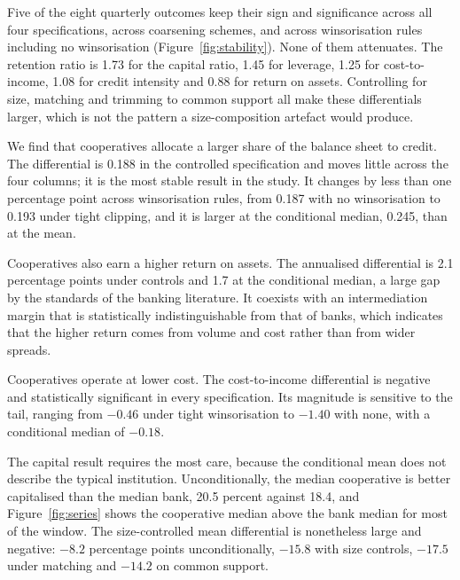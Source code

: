 \documentclass[11pt,a4paper]{article}
\begin{document}
\begin{table}[htbp]
\centering
\begin{threeparttable}
\caption{Cooperative differential against banks, four specifications}
\label{tab:main}

\end{threeparttable}
\end{table}

Five of the eight quarterly outcomes keep their sign and significance across all four
specifications, across coarsening schemes, and across winsorisation rules including no
winsorisation (Figure~\ref{fig:stability}). None of them attenuates. The retention ratio
is 1.73 for the capital ratio, 1.45 for leverage, 1.25 for cost-to-income, 1.08 for
credit intensity and 0.88 for return on assets. Controlling for size, matching and
trimming to common support all make these differentials larger, which is not the pattern
a size-composition artefact would produce.

We find that cooperatives allocate a larger share of the balance sheet to credit. The
differential is 0.188 in the controlled specification and moves little across the four
columns; it is the most stable result in the study. It changes by less than one
percentage point across winsorisation rules, from 0.187 with no winsorisation to 0.193
under tight clipping, and it is larger at the conditional median, 0.245, than at the
mean.

Cooperatives also earn a higher return on assets. The annualised differential is 2.1
percentage points under controls and 1.7 at the conditional median, a large gap by the
standards of the banking literature. It coexists with an intermediation margin that is
statistically indistinguishable from that of banks, which indicates that the higher
return comes from volume and cost rather than from wider spreads.

Cooperatives operate at lower cost. The cost-to-income differential is negative and
statistically significant in every specification. Its magnitude is sensitive to the
tail, ranging from $-0.46$ under tight winsorisation to $-1.40$ with none, with a
conditional median of $-0.18$.

The capital result requires the most care, because the conditional mean does not
describe the typical institution. Unconditionally, the median cooperative is better
capitalised than the median bank, 20.5 percent against 18.4, and Figure~\ref{fig:series}
shows the cooperative median above the bank median for most of the window. The
size-controlled mean differential is nonetheless large and negative: $-8.2$ percentage
points unconditionally, $-15.8$ with size controls, $-17.5$ under matching and $-14.2$ on
common support.
\end{document}

